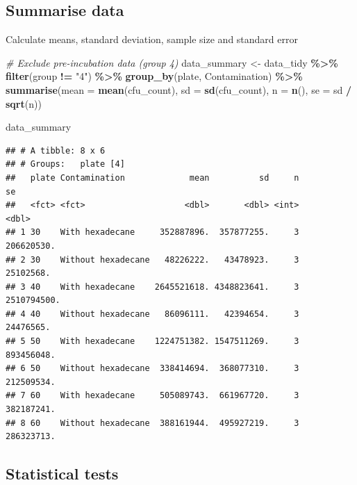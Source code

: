 \documentclass[
]{article}
\newenvironment{Shaded}{\begin{snugshade}}{\end{snugshade}}
\newcommand{\AttributeTok}[1]{\textcolor[rgb]{0.13,0.29,0.53}{#1}}
\newcommand{\CommentTok}[1]{\textcolor[rgb]{0.56,0.35,0.01}{\textit{#1}}}
\newcommand{\FunctionTok}[1]{\textcolor[rgb]{0.13,0.29,0.53}{\textbf{#1}}}
\newcommand{\NormalTok}[1]{#1}
\newcommand{\OtherTok}[1]{\textcolor[rgb]{0.56,0.35,0.01}{#1}}
\newcommand{\SpecialCharTok}[1]{\textcolor[rgb]{0.81,0.36,0.00}{\textbf{#1}}}
\newcommand{\StringTok}[1]{\textcolor[rgb]{0.31,0.60,0.02}{#1}}
\begin{document}
\subsection{Summarise data}\label{summarise-data}

Calculate means, standard deviation, sample size and standard error

\begin{Shaded}
\begin{Highlighting}[]
\CommentTok{\# Exclude pre{-}incubation data (group 4)}
\NormalTok{data\_summary }\OtherTok{\textless{}{-}}\NormalTok{ data\_tidy }\SpecialCharTok{\%\textgreater{}\%}
  \FunctionTok{filter}\NormalTok{(group }\SpecialCharTok{!=} \StringTok{"4"}\NormalTok{) }\SpecialCharTok{\%\textgreater{}\%}
  \FunctionTok{group\_by}\NormalTok{(plate, Contamination) }\SpecialCharTok{\%\textgreater{}\%}
  \FunctionTok{summarise}\NormalTok{(}\AttributeTok{mean =} \FunctionTok{mean}\NormalTok{(cfu\_count),}
            \AttributeTok{sd =} \FunctionTok{sd}\NormalTok{(cfu\_count),}
            \AttributeTok{n =} \FunctionTok{n}\NormalTok{(),}
            \AttributeTok{se =}\NormalTok{ sd }\SpecialCharTok{/} \FunctionTok{sqrt}\NormalTok{(n))}
\end{Highlighting}
\end{Shaded}

\begin{Shaded}
\begin{Highlighting}[]
\NormalTok{data\_summary}
\end{Highlighting}
\end{Shaded}

\begin{verbatim}
## # A tibble: 8 x 6
## # Groups:   plate [4]
##   plate Contamination             mean          sd     n          se
##   <fct> <fct>                    <dbl>       <dbl> <int>       <dbl>
## 1 30    With hexadecane     352887896.  357877255.     3  206620530.
## 2 30    Without hexadecane   48226222.   43478923.     3   25102568.
## 3 40    With hexadecane    2645521618. 4348823641.     3 2510794500.
## 4 40    Without hexadecane   86096111.   42394654.     3   24476565.
## 5 50    With hexadecane    1224751382. 1547511269.     3  893456048.
## 6 50    Without hexadecane  338414694.  368077310.     3  212509534.
## 7 60    With hexadecane     505089743.  661967720.     3  382187241.
## 8 60    Without hexadecane  388161944.  495927219.     3  286323713.
\end{verbatim}

\subsection{Statistical tests}\label{statistical-tests}
\end{document}
